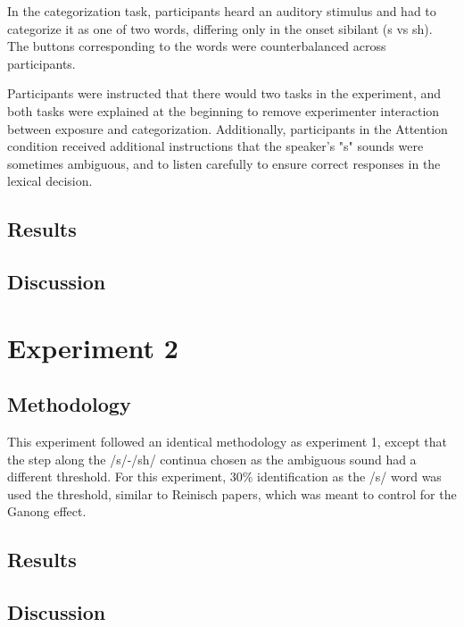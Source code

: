 In the categorization task, participants heard an auditory stimulus and had to categorize it as one of two words, differing only in the onset sibilant (s vs sh).  The buttons corresponding to the words were counterbalanced across participants.

Participants were instructed that there would two tasks in the experiment, and both tasks were explained at the beginning to remove experimenter interaction between exposure and categorization.  Additionally, participants in the Attention condition received additional instructions that the speaker's "s" sounds were sometimes ambiguous, and to listen carefully to ensure correct responses in the lexical decision.


\subsection{Results}

\subsection{Discussion}

\section{Experiment 2}

\subsection{Methodology}

This experiment followed an identical methodology as experiment 1, except that the step along the /s/-/sh/ continua chosen as the ambiguous sound had a different threshold.  For this experiment, 30\% identification as the /s/ word was used the threshold, similar to Reinisch papers, which was meant to control for the Ganong effect.

\subsection{Results}

\subsection{Discussion}